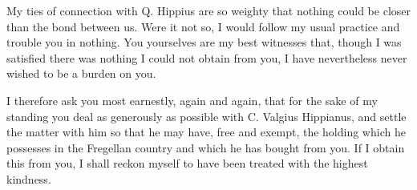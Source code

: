 

 My ties of connection with Q. Hippius are so weighty that nothing could be closer than the bond between us. Were it not so, I would follow my usual practice and trouble you in nothing. You yourselves are my best witnesses that, though I was satisfied there was nothing I could not obtain from you, I have nevertheless never wished to be a burden on you.

 I therefore ask you most earnestly, again and again, that for the sake of my standing you deal as generously as possible with C. Valgius Hippianus, and settle the matter with him so that he may have, free and exempt, the holding which he possesses in the Fregellan country and which he has bought from you. If I obtain this from you, I shall reckon myself to have been treated with the highest kindness.
